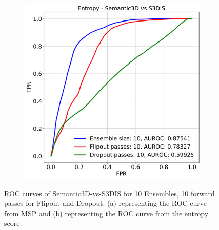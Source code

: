 \begin{figure}[h!]
\begin{subfigure}{0.495\textwidth}
            \includegraphics[scale=0.32]{images/AUROC/Entropy_10.pdf}
            \caption{}
            \label{fig:roc_ent_10_ood_1}
        \end{subfigure}
        \caption{ROC curves of Semantic3D-vs-S3DIS for 10 Ensembles, 10 forward passes for Flipout and Dropout. (a) representing the ROC curve from MSP and (b) representing the ROC curve from the entropy score.}
    \end{figure}
    
